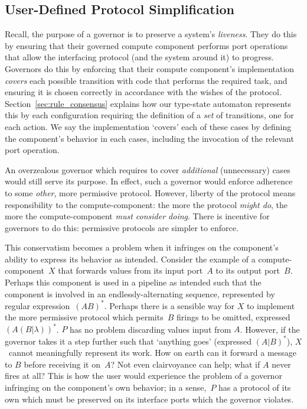 \subsection{User-Defined Protocol Simplification}
\label{sec:user_defined_simplification}
Recall, the purpose of a governor is to preserve a system's \textit{liveness}.
They do this by ensuring that their governed compute component performs port operations that allow the interfacing protocol (and the system around it) to progress. 
Governors do this by enforcing that their compute component's implementation \textit{covers} each possible transition with code that performs the required task, and ensuring it is chosen correctly in accordance with the wishes of the protocol. Section~\ref{sec:rule_consensus} explains how our type-state automaton represents this by each configuration requiring the definition of a \textit{set} of transitions, one for each action. We say the implementation `covers' each of these cases by defining the component's behavior in each cases, including the invocation of the relevant port operation.

An overzealous governor which requires to cover \textit{additional} (unnecessary) cases would still serve its purpose. In effect, such a governor would enforce adherence to some \textit{other}, more permissive protocol. However, liberty of the protocol means responsibility to the compute-component: the more the protocol \textit{might do}, the more the compute-component \textit{must consider doing}. There is incentive for governors to do this: permissive protocols are simpler to enforce.

This conservatism becomes a problem when it infringes on the component's ability to express its behavior as intended. Consider the example of a compute-component~$X$ that forwards values from its input port~$A$ to its output port~$B$. Perhaps this component is used in a pipeline as intended such that the component is involved in an endlessly-alternating sequence, represented by regular expression~$(AB)^*$. Perhaps there is a sensible way for $X$ to implement the more permissive protocol which permits~$B$ firings to be omitted, expressed $(A(B|\lambda{}))^*$. $P$ has no problem discarding values input from $A$. However, if the governor takes it a step further such that `anything goes' (expressed $(A|B)^*$), $X$~cannot meaningfully represent its work. How on earth can it forward a message to $B$ before receiving it on~$A$? Not even clairvoyance can help; what if $A$ never fires at all? This is how the user would experience the problem of a governor infringing on the component's own behavior; in a sense,~$P$ has a protocol of its own which must be preserved on its interface ports which the governor violates.



